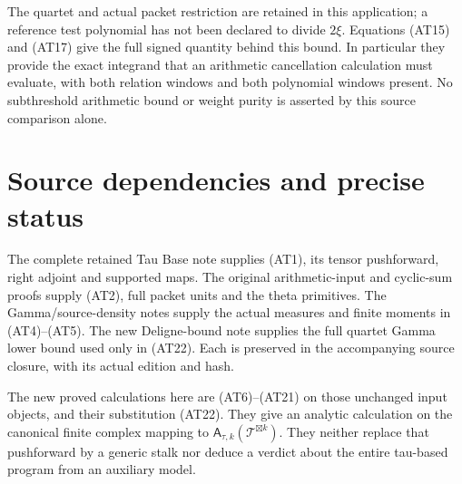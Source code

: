 The quartet and actual packet restriction are retained in this
application; a reference test polynomial has not been declared
to divide $2\xi$. Equations (AT15) and (AT17) give the full
signed quantity behind this bound. In particular they provide
the exact integrand that an arithmetic cancellation calculation
must evaluate, with both relation windows and both polynomial
windows present. No subthreshold arithmetic bound or weight
purity is asserted by this source comparison alone.

\section{Source dependencies and precise status}

The complete retained Tau Base note supplies (AT1), its tensor
pushforward, right adjoint and supported maps. The original
arithmetic-input and cyclic-sum proofs supply (AT2), full packet
units and the theta primitives. The Gamma/source-density notes
supply the actual measures and finite moments in (AT4)--(AT5).
The new Deligne-bound note supplies the full quartet Gamma
lower bound used only in (AT22). Each is preserved in the
accompanying source closure, with its actual edition and hash.

The new proved calculations here are (AT6)--(AT21) on those
unchanged input objects, and their substitution (AT22). They
give an analytic calculation on the canonical finite complex
mapping to $\mathsf A_{\tau,k}(\mathcal T^{\boxtimes k})$.
They neither replace that pushforward by a generic stalk nor
deduce a verdict about the entire tau-based program from an
auxiliary model.
